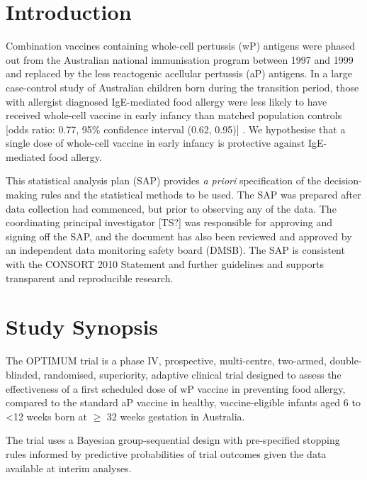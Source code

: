 \documentclass{bmcart}
\begin{document}

\section*{Introduction}

Combination vaccines containing whole-cell pertussis (wP) antigens were phased out from the Australian national immunisation program between 1997 and 1999 and replaced by the less reactogenic acellular pertussis (aP) antigens.
In a large case-control study of Australian children born during the transition period, those with allergist diagnosed IgE-mediated food allergy were less likely to have received whole-cell vaccine in early infancy than matched population controls [odds ratio: 0.77, 95\% confidence interval (0.62, 0.95)] \cite{estcourt2020whole}.
We hypothesise that a single dose of whole-cell vaccine in early infancy is protective against IgE-mediated food allergy.

This statistical analysis plan (SAP) provides \textit{a priori} specification of the decision-making rules and the statistical methods to be used. 
The SAP was prepared after data collection had commenced, but prior to observing any of the data. 
The coordinating principal investigator [TS?] was responsible for approving and signing off the SAP, and the document has also been reviewed and approved by an independent data monitoring safety board (DMSB). 
The SAP is consistent with the CONSORT 2010 Statement and further guidelines and supports transparent and reproducible research.

\section*{Study Synopsis}

The OPTIMUM trial is a phase IV, prospective, multi-centre, two-armed, double-blinded, randomised, superiority, adaptive clinical trial designed to assess the effectiveness of a first scheduled dose of wP vaccine in preventing food allergy, compared to the standard aP vaccine in healthy, vaccine-eligible infants aged 6 to \textless12 weeks born at \(\geq\) 32 weeks gestation in Australia.

The trial uses a Bayesian group-sequential design with pre-specified stopping rules informed by predictive probabilities of trial outcomes given the data available at interim analyses.
\end{document}
